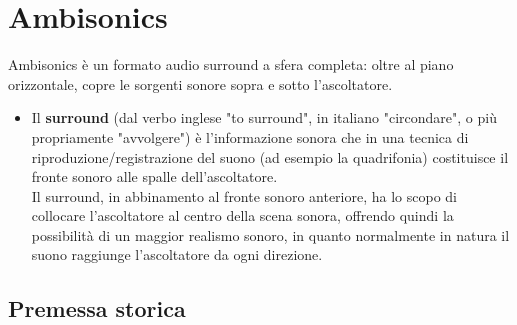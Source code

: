 \chapter{Ambisonics}
\label{chp:Ambisonics}

Ambisonics è un formato audio surround a sfera completa: oltre al piano orizzontale, copre le sorgenti sonore sopra e sotto l'ascoltatore.
\begin{itemize}
\item Il \textbf{surround} (dal verbo inglese "to surround", in italiano "circondare", o più propriamente "avvolgere") è l'informazione sonora che in una tecnica di riproduzione/registrazione del suono (ad esempio la quadrifonia) costituisce il fronte sonoro alle spalle dell'ascoltatore.\\ Il surround, in abbinamento al fronte sonoro anteriore, ha lo scopo di collocare l'ascoltatore al centro della scena sonora, offrendo quindi la possibilità di un maggior realismo sonoro, in quanto normalmente in natura il suono raggiunge l'ascoltatore da ogni direzione.\\
\end{itemize}

\section{Premessa storica}

